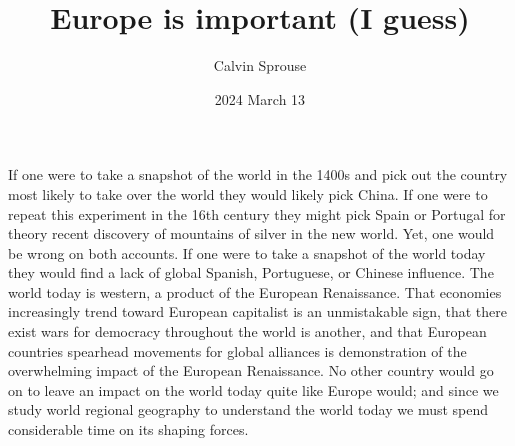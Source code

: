 \documentclass[a4paper, 12pt]{article}
\title{Europe is important (I guess)}
\author{Calvin Sprouse}
\affil{Geography 101 World Regional Geography}
\date{2024 March 13}
\begin{document}
\maketitle

If one were to take a snapshot of the world in the 1400s and pick out the country most likely to take over the world they would likely pick China. If one were to repeat this experiment in the 16th century they might pick Spain or Portugal for theory recent discovery of mountains of silver in the new world. Yet, one would be wrong on both accounts. If one were to take a snapshot of the world today they would find a lack of global Spanish, Portuguese, or Chinese influence. The world today is western, a product of the European Renaissance. That economies increasingly trend toward European capitalist is an unmistakable sign, that there exist wars for democracy throughout the world is another, and that European countries spearhead movements for global alliances is demonstration of the overwhelming impact of the European Renaissance. No other country would go on to leave an impact on the world today quite like Europe would; and since we study world regional geography to understand the world today we must spend considerable time on its shaping forces. 
\end{document}
